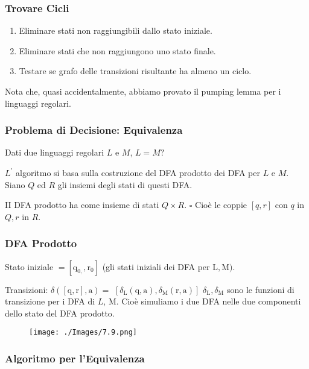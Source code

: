 \subsubsection{Trovare Cicli}

\begin{enumerate}
    \item Eliminare stati non raggiungibili dallo stato iniziale.
    \item Eliminare stati che non raggiungono uno stato finale.
    \item Testare se grafo delle transizioni risultante ha almeno un ciclo.
\end{enumerate}

Nota che, quasi accidentalmente, abbiamo provato il pumping lemma per i linguaggi regolari.

\subsubsection{Problema di Decisione: Equivalenza}

Dati due linguaggi regolari $L$ e $M$,
$L=M ?$

$L^{\prime}$ algoritmo si basa sulla costruzione del
DFA prodotto dei DFA per $L$ e $M$.
Siano $Q$ ed $R$ gli insiemi degli stati di
questi DFA.

II DFA prodotto ha come insieme di stati
$Q \times R$.
$\square$ Cioè le coppie $[q, r]$ con $q$ in $Q, r$ in $R$.

\subsubsection{DFA Prodotto}

Stato iniziale $=\left[\mathrm{q}_{0,}, \mathrm{r}_{0}\right]$ (gli stati iniziali
dei DFA per $\mathrm{L}, \mathrm{M})$.

Transizioni: $\delta([\mathrm{q}, \mathrm{r}], \mathrm{a})=$
$\left[\delta_{\mathrm{L}}(\mathrm{q}, \mathrm{a}), \delta_{\mathrm{M}}(\mathrm{r}, \mathrm{a})\right]$
$ \delta_{\mathrm{L}}, \delta_{\mathrm{M}}$ sono le funzioni di transizione per i
DFA di $L$, M.
Cioè simuliamo i due DFA nelle due
componenti dello stato del DFA prodotto.

\begin{figure}[hbpt!]
    \centering
    \texttt{[image: ./Images/7.9.png]}
\end{figure}
\FloatBarrier

\subsubsection{Algoritmo per l’Equivalenza}


